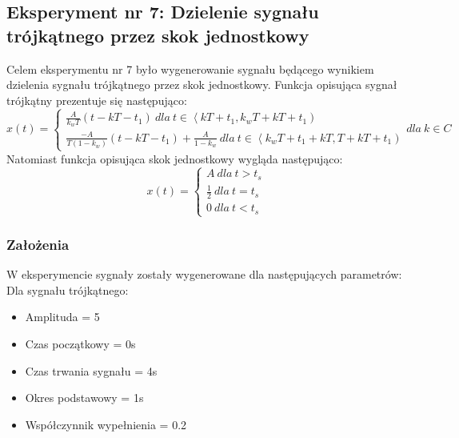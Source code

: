 \documentclass[12pt]{article}
\begin{document}

\newpage
\subsection{Eksperyment nr 7: Dzielenie sygnału trójkątnego przez skok jednostkowy}
Celem eksperymentu nr 7 było wygenerowanie sygnału będącego wynikiem dzielenia sygnału trójkątnego przez skok jednostkowy.
Funkcja opisująca sygnał trójkątny prezentuje się następująco:
 \begin{equation}
    x(t) = \left\{\begin{matrix} \frac{A}{k_wT}(t-kT-t_1)\: dla \: t\in \left \langle kT + t_1,k_wT + kT + t_1 \right) \\ \frac{-A}{T(1-k_w)}(t - kT - t_1) + \frac{A}{1-k_w}\: dla \: t\in \left \langle k_wT + t_1 + kT, T + kT + t_1 \right) \end{matrix}\right. dla \: k\in C\    
 \end{equation}
Natomiast funkcja opisująca skok jednostkowy wygląda następująco:
\begin{equation}
    x(t) = \left\{\begin{matrix} A \: dla \: t>t_s \\ \frac{1}{2} \: dla \: t=t_s \\ 0 \: dla \: t<t_s \end{matrix}\right.\    
\end{equation}



\subsubsection{Założenia}
W eksperymencie sygnały zostały wygenerowane dla następujących parametrów:\\
Dla sygnału trójkątnego:
\begin{itemize}
    \item Amplituda = 5
    \item Czas początkowy = 0s
    \item Czas trwania sygnału = 4s
    \item Okres podstawowy = 1s
    \item Współczynnik wypełnienia = 0.2
\end{itemize}
\end{document}
